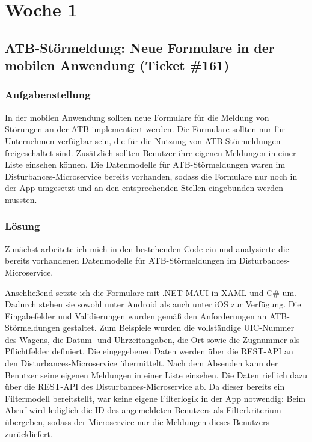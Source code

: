 \section{Woche 1}

\subsection{ATB-Störmeldung: Neue Formulare in der mobilen Anwendung (Ticket \#161)}

    \subsubsection{Aufgabenstellung}
    In der mobilen Anwendung sollten neue Formulare für die Meldung von Störungen an der \ac{ATB}
    implementiert werden. Die Formulare sollten nur für Unternehmen verfügbar sein, die für die
    Nutzung von ATB-Störmeldungen freigeschaltet sind. Zusätzlich sollten Benutzer ihre eigenen
    Meldungen in einer Liste einsehen können.
    Die Datenmodelle für ATB-Störmeldungen waren im Disturbances-Microservice bereits vorhanden,
    sodass die Formulare nur noch in der App umgesetzt und an den entsprechenden Stellen
    eingebunden werden mussten.

    \subsubsection{Lösung}
    Zunächst arbeitete ich mich in den bestehenden Code ein und analysierte die bereits vorhandenen
    Datenmodelle für ATB-Störmeldungen im Disturbances-Microservice.

    Anschließend setzte ich die Formulare mit .NET MAUI in XAML und C\# um.
    Dadurch stehen sie sowohl unter Android als auch unter iOS zur Verfügung.
    Die Eingabefelder und Validierungen wurden gemäß den Anforderungen an ATB-Störmeldungen gestaltet.
    Zum Beispiele wurden die vollständige \ac{UIC}-Nummer des Wagens, die Datum- und Uhrzeitangaben, 
    die Ort sowie die Zugnummer als Pflichtfelder definiert.
    Die eingegebenen Daten werden über die REST-API an den Disturbances-Microservice übermittelt.
    Nach dem Absenden kann der Benutzer seine eigenen Meldungen in einer Liste einsehen.
    Die Daten rief ich dazu über die REST-API des Disturbances-Microservice ab. Da dieser
    bereits ein Filtermodell bereitstellt, war keine eigene Filterlogik in der App notwendig:
    Beim Abruf wird lediglich die ID des angemeldeten Benutzers als Filterkriterium übergeben,
    sodass der Microservice nur die Meldungen dieses Benutzers zurückliefert.

